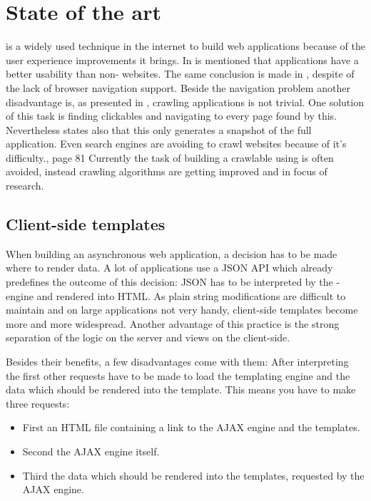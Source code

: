 \section{State of the art}
\ajax{} is a widely used technique in the internet to build web applications because of the user experience improvements it brings.
In \cite{bib:roodt06} is mentioned that \ajax{} applications have a better usability than non-\ajax{} websites.
The same conclusion is made in \cite{bib:klugeKarglWeber07}, despite of the lack of browser navigation support.
Beside the navigation problem another disadvantage is, as presented in \cite{bib:mesbah09}, crawling \ajax{} applications is not trivial.
One solution of this task is finding clickables and navigating to every page found by this.
Nevertheless \cite{bib:mesbah09} states also that this only generates a snapshot of the full application.
Even search engines are avoiding to crawl websites because of it's difficulty.\cite{bib:matter08}, page 81
Currently the task of building a crawlable \singlePageApplication{} using \ajax{} is often avoided, instead crawling algorithms are getting improved and in focus of research.

\subsection{Client-side templates\label{clientSideTemplates}}
When building an asynchronous web application, a decision has to be made where to render data.
A lot of \ajax{} applications use a JSON API which already predefines the outcome of this decision:
JSON has to be interpreted by the \ajax{}-engine and rendered into HTML.
As plain string modifications are difficult to maintain and on large applications not very handy, client-side templates become more and more widespread.
Another advantage of this practice is the strong separation of the logic on the server and views on the client-side.

Besides their benefits, a few disadvantages come with them:
After interpreting the first \httpRequest{} other requests have to be made to load the templating engine and the data which should be rendered into the template.
This means you have to make three requests:
\begin{itemize}
    \item First an HTML file containing a link to the AJAX engine and the templates.
    \item Second the AJAX engine itself.
    \item Third the data which should be rendered into the templates, requested by the AJAX engine.
\end{itemize}

